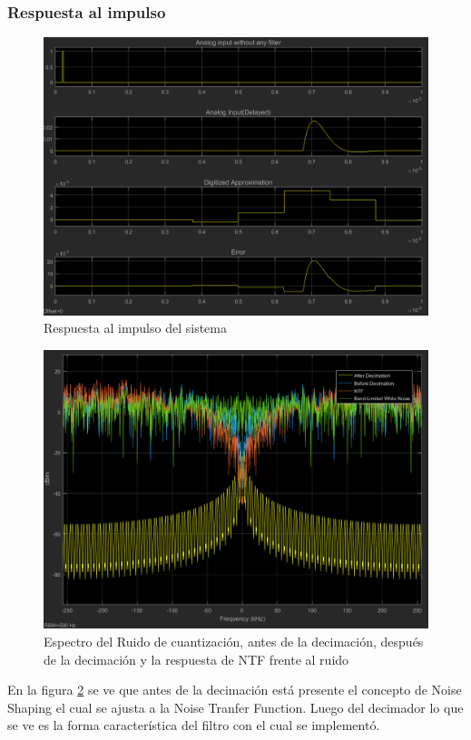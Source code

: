 \documentclass[assd_tp3_main.tex]{subfiles}
\begin{document}
\subsubsection{Respuesta al impulso}
\begin{figure}[H]
\centering
\includegraphics[width=1\linewidth]{images/ej4/impulse_response.png}
\caption{Respuesta al impulso del sistema}
\label{fig:impulse_response}
\end{figure}

\begin{figure}[H]
\centering
\includegraphics[width=1\linewidth]{images/ej4/NTF.png}
\caption{Espectro del Ruido de cuantización, antes de la decimación, después de la decimación y la respuesta de NTF frente al ruido}
\label{fig:NTF}
\end{figure}
En la figura \ref{fig:NTF} se ve que antes de la decimación está presente el concepto de Noise Shaping el cual se ajusta a la Noise Tranfer Function. Luego del decimador lo que se ve es la forma característica del filtro con el cual se implementó.
\end{document}
